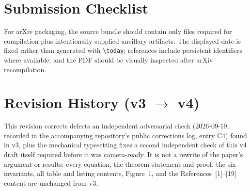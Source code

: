 \documentclass[10pt,twocolumn]{article}
\begin{document}
\section{Submission Checklist}
For arXiv packaging, the source bundle should contain only files required for compilation plus intentionally supplied ancillary artifacts. The displayed date is fixed rather than generated with \verb|\today|; references include persistent identifiers where available; and the PDF should be visually inspected after arXiv recompilation.

\section{Revision History (v3 $\to$ v4)}
This revision corrects defects an independent adversarial check (2026-09-19, recorded in the accompanying repository's public corrections log, entry C4) found in v3, plus the mechanical typesetting fixes a second independent check of this v4 draft itself required before it was camera-ready. It is not a rewrite of the paper's argument or results: every equation, the theorem statement and proof, the six invariants, all table and listing contents, Figure~1, and the References~[1]--[19] content are unchanged from v3.
\end{document}
